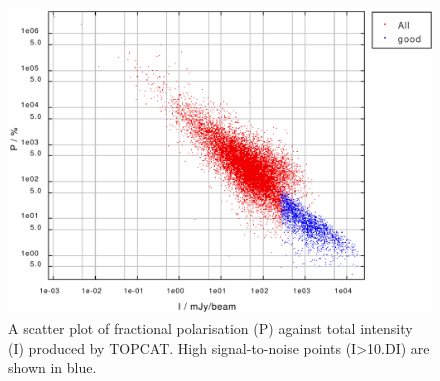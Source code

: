 \begin{figure}[t!]
\begin{center}
\includegraphics[width=0.75\linewidth]{sc22-topcat}
\caption [A TOPCAT scatter plot]{A scatter plot of fractional polarisation (P)
against total intensity (I) produced by TOPCAT. High signal-to-noise points
(I>10.DI) are shown in blue.\label{fig:topcat}}
\end{center}
\end{figure}

